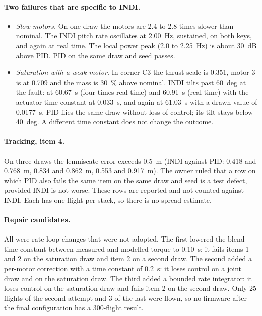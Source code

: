 \paragraph{Two failures that are specific to INDI.}
\begin{itemize}
  \item \emph{Slow motors.} On one draw the motors are 2.4 to 2.8 times slower than nominal. The INDI pitch rate oscillates at 2.00~Hz, sustained, on both keys, and again at real time. The local power peak (2.0 to 2.25~Hz) is about 30~dB above PID. PID on the same draw and seed passes.
  \item \emph{Saturation with a weak motor.} In corner C3 the thrust scale is 0.351, motor 3 is at 0.709 and the mass is 30~\% above nominal. INDI tilts past 60~deg at the fault: at 60.67~s (four times real time) and 60.91~s (real time) with the actuator time constant at 0.033~s, and again at 61.03~s with a drawn value of 0.0177~s. PID flies the same draw without loss of control; its tilt stays below 40~deg. A different time constant does not change the outcome.
\end{itemize}

\paragraph{Tracking, item 4.}
On three draws the lemniscate error exceeds 0.5~m (INDI against PID: 0.418 and 0.768~m, 0.834 and 0.862~m, 0.553 and 0.917~m).
The owner ruled that a row on which PID also fails the same item on the same draw and seed is a test defect, provided INDI is not worse.
These rows are reported and not counted against INDI.
Each has one flight per stack, so there is no spread estimate.

\paragraph{Repair candidates.}
All were rate-loop changes that were not adopted.
The first lowered the blend time constant between measured and modelled torque to 0.10~s: it fails items 1 and 2 on the saturation draw and item 2 on a second draw.
The second added a per-motor correction with a time constant of 0.2~s: it loses control on a joint draw and on the saturation draw.
The third added a bounded rate integrator: it loses control on the saturation draw and fails item 2 on the second draw.
Only 25 flights of the second attempt and 3 of the last were flown, so no firmware after the final configuration has a 300-flight result.

